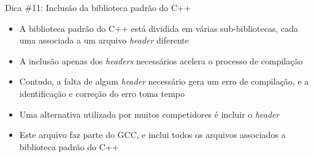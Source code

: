 \begin{frame}[fragile]{Dica \#11: Inclusão da biblioteca padrão do C++}

    \begin{itemize}
        \item A biblioteca padrão do C++ está dividida em várias sub-bibliotecas, cada uma
            associada a um arquivo \textit{header} diferente

        \item A inclusão apenas dos \textit{headers} necessários acelera o processo de
            compilação

        \item Contudo, a falta de algum \textit{header} necessário gera um erro de compilação,
            e a identificação e correção do erro toma tempo

        \item Uma alternativa utilizada por muitos competidores é incluir o \textit{header}

        \item Este arquivo faz parte do GCC, e inclui todos os arquivos associados a biblioteca
            padrão do C++
    \end{itemize}

\end{frame}
